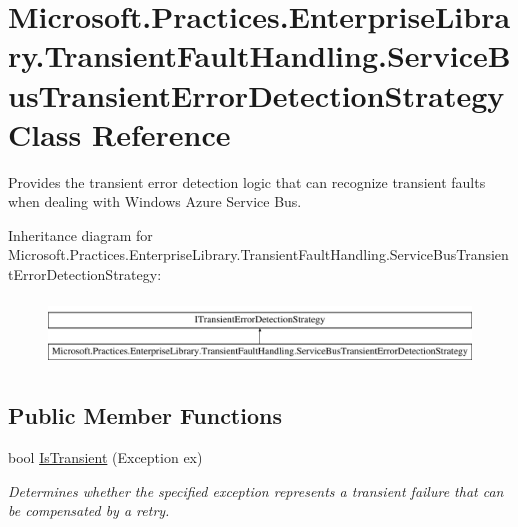 \hypertarget{classMicrosoft_1_1Practices_1_1EnterpriseLibrary_1_1TransientFaultHandling_1_1ServiceBusTransientErrorDetectionStrategy}{}\section{Microsoft.\+Practices.\+Enterprise\+Library.\+Transient\+Fault\+Handling.\+Service\+Bus\+Transient\+Error\+Detection\+Strategy Class Reference}
\label{classMicrosoft_1_1Practices_1_1EnterpriseLibrary_1_1TransientFaultHandling_1_1ServiceBusTransientErrorDetectionStrategy}


Provides the transient error detection logic that can recognize transient faults when dealing with Windows Azure Service Bus.  


Inheritance diagram for Microsoft.\+Practices.\+Enterprise\+Library.\+Transient\+Fault\+Handling.\+Service\+Bus\+Transient\+Error\+Detection\+Strategy\+:\begin{figure}[H]
\begin{center}
\leavevmode
\includegraphics[height=1.812298cm]{classMicrosoft_1_1Practices_1_1EnterpriseLibrary_1_1TransientFaultHandling_1_1ServiceBusTransientErrorDetectionStrategy}
\end{center}
\end{figure}
\subsection*{Public Member Functions}
\begin{DoxyCompactItemize}
\item 
bool \hyperlink{classMicrosoft_1_1Practices_1_1EnterpriseLibrary_1_1TransientFaultHandling_1_1ServiceBusTransientErrorDetectionStrategy_a1d5de793d531ec7ca5a5eccad3e00b60_a1d5de793d531ec7ca5a5eccad3e00b60}{Is\+Transient} (Exception ex)
\begin{DoxyCompactList}\small\item\em Determines whether the specified exception represents a transient failure that can be compensated by a retry. \end{DoxyCompactList}\end{DoxyCompactItemize}


